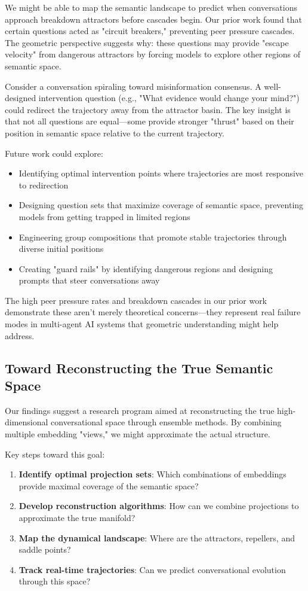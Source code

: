 \documentclass[11pt,letterpaper]{article}
\begin{document}
We might be able to map the semantic landscape to predict when conversations approach breakdown attractors before cascades begin. Our prior work \citep{garcia2025peer} found that certain questions acted as "circuit breakers," preventing peer pressure cascades. The geometric perspective suggests why: these questions may provide "escape velocity" from dangerous attractors by forcing models to explore other regions of semantic space.

Consider a conversation spiraling toward misinformation consensus. A well-designed intervention question (e.g., "What evidence would change your mind?") could redirect the trajectory away from the attractor basin. The key insight is that not all questions are equal—some provide stronger "thrust" based on their position in semantic space relative to the current trajectory.

Future work could explore:
\begin{itemize}
\item Identifying optimal intervention points where trajectories are most responsive to redirection
\item Designing question sets that maximize coverage of semantic space, preventing models from getting trapped in limited regions
\item Engineering group compositions that promote stable trajectories through diverse initial positions
\item Creating "guard rails" by identifying dangerous regions and designing prompts that steer conversations away
\end{itemize}

The high peer pressure rates and breakdown cascades in our prior work demonstrate these aren't merely theoretical concerns—they represent real failure modes in multi-agent AI systems that geometric understanding might help address.

\subsection{Toward Reconstructing the True Semantic Space}

Our findings suggest a research program aimed at reconstructing the true high-dimensional conversational space through ensemble methods. By combining multiple embedding "views," we might approximate the actual structure.

Key steps toward this goal:
\begin{enumerate}
\item \textbf{Identify optimal projection sets}: Which combinations of embeddings provide maximal coverage of the semantic space?
\item \textbf{Develop reconstruction algorithms}: How can we combine projections to approximate the true manifold?
\item \textbf{Map the dynamical landscape}: Where are the attractors, repellers, and saddle points?
\item \textbf{Track real-time trajectories}: Can we predict conversational evolution through this space?
\end{enumerate}
\end{document}
